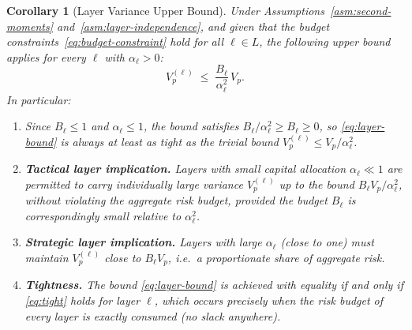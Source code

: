 \documentclass[12pt,openany]{book}
\numberwithin{equation}{chapter}
\theoremstyle{plain}
\newtheorem{corollary}[theorem]{Corollary}
\theoremstyle{definition}
\theoremstyle{remark}
\def\mathcal#1{#1}%
\begin{document}
\begin{corollary}[Layer Variance Upper Bound]
\label{cor:layer-bound}
Under Assumptions~\ref{asm:second-moments}
and~\ref{asm:layer-independence}, and given that the budget
constraints~\eqref{eq:budget-constraint} hold for all
$\ell \in \mathcal{L}$, the following upper bound applies for
every $\ell$ with $\alpha_\ell > 0$:
\begin{equation}
  V_p^{(\ell)}
  \;\leq\;
  \frac{B_\ell}{\alpha_\ell^2}\, V_p.
  \label{eq:layer-bound}
\end{equation}
In particular:
\begin{enumerate}
  \item Since $B_\ell \leq 1$ and $\alpha_\ell \leq 1$,
        the bound satisfies
        $B_\ell / \alpha_\ell^2 \geq B_\ell \geq 0$,
        so \eqref{eq:layer-bound} is always at least as tight as
        the trivial bound $V_p^{(\ell)} \leq V_p / \alpha_\ell^2$.
  \item \textbf{Tactical layer implication.}
        Layers with small capital allocation $\alpha_\ell \ll 1$
        are permitted to carry individually large variance
        $V_p^{(\ell)}$ up to the bound $B_\ell V_p / \alpha_\ell^2$,
        without violating the aggregate risk budget, provided
        the budget $B_\ell$ is correspondingly small relative to
        $\alpha_\ell^2$.
  \item \textbf{Strategic layer implication.}
        Layers with large $\alpha_\ell$ (close to one) must
        maintain $V_p^{(\ell)}$ close to $B_\ell V_p$, i.e.\ a
        proportionate share of aggregate risk.
  \item \textbf{Tightness.}
        The bound \eqref{eq:layer-bound} is achieved with equality
        if and only if \eqref{eq:tight} holds for layer $\ell$,
        which occurs precisely when the risk budget of every layer
        is exactly consumed (no slack anywhere).
\end{enumerate}
\end{corollary}
\end{document}
